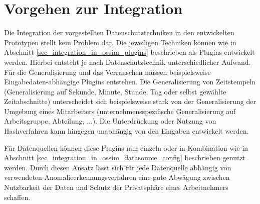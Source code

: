 \section{Vorgehen zur Integration}

Die Integration der vorgestellten Datenschutztechniken in den entwickelten Prototypen stellt kein Problem dar. Die jeweiligen Techniken können wie in Abschnitt \ref{sec_integration_in_ossim_plugins} beschrieben als Plugins entwickelt werden. Hierbei entsteht je nach Datenschutztechnik unterschiedlicher Aufwand.\\
Für die Generalisierung und das Verrauschen müssen beispielsweise Eingabedaten-abhängige Plugins entstehen. Die Generalisierung von Zeitstempeln (Generalisierung auf Sekunde, Minute, Stunde, Tag oder selbst gewählte Zeitabschnitte) unterscheidet sich beispielsweise stark von der Generalisierung der Umgebung eines Mitarbeiters (unternehmensspezifische Generalisierung auf Arbeitsgruppe, Abteilung, ...). Die Unterdrückung oder Nutzung von Hashverfahren kann hingegen unabhängig von den Eingaben entwickelt werden.

Für Datenquellen können diese Plugins nun einzeln oder in Kombination wie in Abschnitt \ref{sec_integration_in_ossim_datasource_config} beschrieben genutzt werden. Durch diesen Ansatz lässt sich für jede Datenquelle abhängig von verwendeten Anomalieerkennungsverfahren eine gute Abwägung zwischen Nutzbarkeit der Daten und Schutz der Privatsphäre eines Arbeitnehmers schaffen.